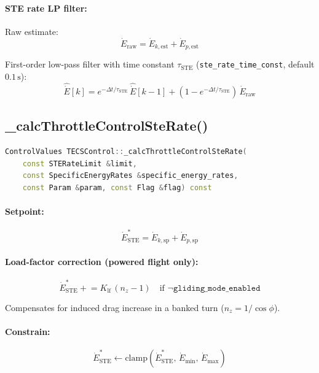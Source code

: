 \documentclass[12pt,a4paper]{article}
\begin{document}
\paragraph{STE rate LP filter:}
Raw estimate:
\begin{equation}
  \dot{E}_{\text{raw}} = \dot{E}_{k,\text{est}} + \dot{E}_{p,\text{est}}
\end{equation}

First-order low-pass filter with time constant
$\tau_{\text{STE}}$ (\texttt{ste\_rate\_time\_const}, default $0.1\,\text{s}$):
\begin{equation}
  \hat{\dot{E}}[k] = e^{-\Delta t/\tau_{\text{STE}}}\,\hat{\dot{E}}[k-1]
                   + (1 - e^{-\Delta t/\tau_{\text{STE}}})\,\dot{E}_{\text{raw}}
\end{equation}

\subsection{\_calcThrottleControlSteRate()}

\begin{lstlisting}[language=C++]
ControlValues TECSControl::_calcThrottleControlSteRate(
    const STERateLimit &limit,
    const SpecificEnergyRates &specific_energy_rates,
    const Param &param, const Flag &flag) const
\end{lstlisting}

\paragraph{Setpoint:}
\begin{equation}
  \dot{E}^*_{\text{STE}} = \dot{E}_{k,\text{sp}} + \dot{E}_{p,\text{sp}}
\end{equation}

\paragraph{Load-factor correction (powered flight only):}
\begin{equation}
  \dot{E}^*_{\text{STE}} \mathrel{+}= K_{\text{lf}}\,(n_z - 1)
  \quad \text{if } \neg\texttt{gliding\_mode\_enabled}
\end{equation}

Compensates for induced drag increase in a banked turn
($n_z = 1/\cos\phi$).

\paragraph{Constrain:}
\begin{equation}
  \dot{E}^*_{\text{STE}} \leftarrow \text{clamp}(\dot{E}^*_{\text{STE}},\,
    \dot{E}_{\min},\, \dot{E}_{\max})
\end{equation}
\end{document}
